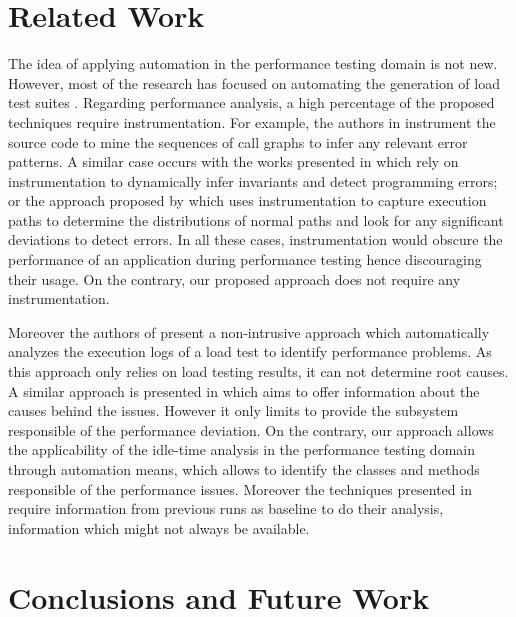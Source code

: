\documentclass[runningheads,a4paper]{llncs}
\begin{document}
\section{Related Work}
\label{RelatedWork}
\vspace{-5pt}
The idea of applying automation in the performance testing domain is not new.
However, most of the research has focused on automating the generation of load
test suites
\cite{Chen1,Elvira1,Zhang1,Briand1,Bayan1,Avritzer2,Avritzer3,Garousi1}.
Regarding performance analysis, a high percentage of the proposed
techniques require instrumentation. For example, the authors in \cite{Yang1}
instrument the source code to mine the sequences of call graphs to infer any
relevant error patterns. A similar case occurs with the works presented in
\cite{Hangal1,Csallner1} which rely on instrumentation to dynamically infer
invariants and detect programming errors; or the approach proposed by
\cite{Chen2} which uses instrumentation to capture execution paths to determine
the distributions of normal paths and look for any significant deviations to
detect errors. In all these cases, instrumentation would obscure the performance
of an application during performance testing hence discouraging their usage.
On the contrary, our proposed approach does not require any instrumentation.

Moreover the authors of \cite{Jiang2009} present a non-intrusive approach which
automatically analyzes the execution logs of a load test to identify performance
problems. As this approach only relies on load testing results, it can not
determine root causes. A similar approach is presented in \cite{Malik1} which
aims to offer information about the causes behind the issues. However it only
limits to provide the subsystem responsible of the performance deviation. On the
contrary, our approach allows the applicability of the idle-time analysis in the
performance testing domain through automation means, which allows to identify the 
classes and methods responsible of the performance issues. Moreover the techniques presented
in \cite{Jiang2009,Malik1} require information from previous runs as
baseline to do their analysis, information which might not always be available.

\vspace{-5pt}
\section{Conclusions and Future Work}
\label{Conclusions}
\vspace{-5pt}
\end{document}
